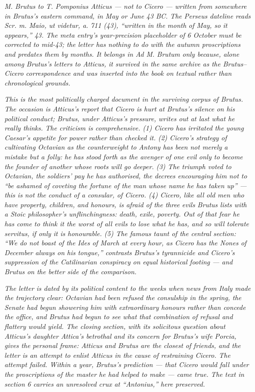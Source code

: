
\textit{M. Brutus to T. Pomponius Atticus --- not to
Cicero --- written from somewhere in Brutus's eastern
command, in May or June 43 BC. The Perseus dateline reads
\textit{Scr. m. Maio, ut videtur, a. 711 (43)}, ``written
in the month of May, so it appears,'' 43. The meta entry's
year-precision placeholder of 6 October must be corrected
to mid-43; the letter has nothing to do with the autumn
proscriptions and predates them by months. It belongs in
\textit{Ad M. Brutum} only because, alone among Brutus's
letters to Atticus, it survived in the same archive as
the Brutus--Cicero correspondence and was inserted into
the book on textual rather than chronological grounds.}

\textit{This is the most politically charged document in
the surviving corpus of Brutus. The occasion is Atticus's
report that Cicero is hurt at Brutus's silence on his
political conduct; Brutus, under Atticus's pressure,
writes out at last what he really thinks. The criticism
is comprehensive. (1) Cicero has irritated the young
Caesar's appetite for power rather than checked it.
(2) Cicero's strategy of cultivating Octavian as the
counterweight to Antony has been not merely a mistake but
a folly: he has stood forth as the avenger of one evil
only to become the founder of another whose roots will go
deeper. (3) The triumph voted to Octavian, the soldiers'
pay he has authorised, the decrees encouraging him not to
``be ashamed of coveting the fortune of the man whose name
he has taken up'' --- this is not the conduct of a
consular, of \textit{Cicero}. (4) Cicero, like all old men
who have property, children, and honours, is afraid of the
three evils Brutus lists with a Stoic philosopher's
unflinchingness: death, exile, poverty. Out of that fear
he has come to think it the worst of all evils to lose
what he has, and so will tolerate \textit{servitus}, if
only it is honourable. (5) The famous taunt of the central
section: ``We do not boast of the Ides of March at every
hour, as Cicero has the Nones of December always on his
tongue,'' contrasts Brutus's tyrannicide and Cicero's
suppression of the Catilinarian conspiracy on equal
historical footing --- and Brutus on the better side of
the comparison.}

\textit{The letter is dated by its political content to
the weeks when news from Italy made the trajectory clear:
Octavian had been refused the consulship in the spring,
the Senate had begun showering him with extraordinary
honours rather than concede the office, and Brutus had
begun to see what that combination of refusal and
flattery would yield. The closing section, with its
solicitous question about Atticus's daughter Attica's
betrothal and its concern for Brutus's wife Porcia, gives
the personal frame: Atticus and Brutus are the closest of
friends, and the letter is an attempt to enlist Atticus
in the cause of restraining Cicero. The attempt failed.
Within a year, Brutus's prediction --- that Cicero would
fall under the proscriptions of the master he had helped
to make --- came true. The text in section 6 carries an
unresolved crux at ``\textit{Antonius},'' here preserved.}
